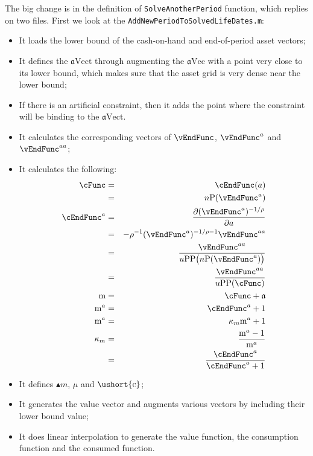 \documentclass[titlepage,abstract]{\econtex}
\providecommand{\mFunc}{\ensuremath{\mathrm{m}}}
\providecommand{\aEndFunc}{\ensuremath{\mathfrak{a}}}
\begin{document}
The big change is in the definition of \texttt{SolveAnotherPeriod} function, which replies on two files. First we look at the \texttt{AddNewPeriodToSolvedLifeDates.m}:
      \begin{itemize}
        \item It loads the lower bound of the cash-on-hand and end-of-period asset vectors;
        \item It defines the $\ensuremath{\mathfrak{a}}\text{Vect}$ through augmenting the $\ensuremath{\mathfrak{a}}\text{Vec}$ with a point very close to its lower bound, which makes sure that the asset grid is very dense near the lower bound;
        \item If there is an artificial constraint, then it adds the point where the constraint will be binding to the $\ensuremath{\mathfrak{a}}\text{Vect}$.
        \item It calculates the corresponding vectors of $\vEndFunc$, $\vEndFunc^{a}$ and $\vEndFunc^{aa}$;
        \item It calculates the following:
        \begin{eqnarray}
        \cFunc &=& \cEndFunc(a) \\
        &=& n\text{P}(\vEndFunc^{a}) \\
        \cEndFunc^{a} &=&\frac{\partial (\vEndFunc^{a})^{-1/\rho}}{\partial a} \\
        &=& -\rho^{-1} (\vEndFunc^{a})^{-1/\rho-1} \vEndFunc^{aa} \\
        &=& \frac{\vEndFunc^{aa} }{u\text{PP}\big(
        n\text{P}(\vEndFunc^{a})\big)} \\
        &=& \frac{\vEndFunc^{aa} }{u\text{PP}(\cFunc)} \\
        \mFunc &=& \cFunc + \aEndFunc \\
        \mFunc^{a} &=& \cEndFunc^{a} + 1 \\
        \mFunc^{a} &=& \kappa_{m}\mFunc^{a} + 1 \\
        \kappa_{m} &=& \frac{\mFunc^{a}-1}{\mFunc^{a}} \\
        &=& \frac{\cEndFunc^{a}}{\cEndFunc^{a}+1}
        \end{eqnarray}
        \item It defines $\ensuremath{\blacktriangle {m}}$, $\mu$ and $\ensuremath{\ushort{\mathrm{c}}}$;
        \item It generates the value vector and augments various vectors by including their lower bound value;
        \item It does linear interpolation to generate the value function, the consumption function and the consumed function.
        \end{itemize}
\end{document}
